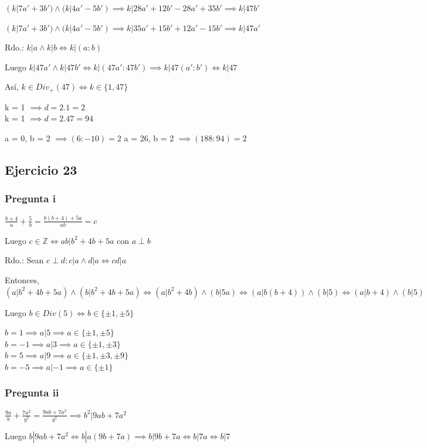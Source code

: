 $ (k|7a' + 3b') \wedge (k|4a' - 5b') \implies k|28a' + 12b' -28a' +35b' \implies k|47b' $

$ (k|7a' + 3b') \wedge (k|4a' - 5b') \implies k|35a'+15b'+12a'-15b' \implies k|47a' $

Rdo.: $ k|a \wedge k|b \iff k|(a:b)$

Luego $ k|47a' \wedge k|47b' \iff k|(47a':47b') \implies k|47(a':b') \iff k|47 $

Así, $ k \in Div_+(47) \iff k\in \{ 1,47 \} $

k = 1 $ \implies d = 2.1 = 2 $ \\
k = 1 $ \implies d = 2.47 = 94 $

a = 0, b = 2 $ \implies (6:-10) = 2$
a = 26, b = 2 $ \implies (188:94) = 2$

\subsection{Ejercicio 23}
\subsubsection{Pregunta i}

$ \frac{b+4}{a} + \frac{5}{b} = \frac{b(b+4) + 5a}{ab} = c $

Luego $ c\in \mathbb{Z} \iff ab|b^2+4b+5a $ con $ a\perp b $

Rdo.: Sean $ c \perp d: c|a \wedge d|a \iff cd|a $

Entonces, $ (a|b^2+4b+5a) \wedge (b|b^2+4b+5a) \iff (a|b^2+4b) \wedge (b|5a) \iff (a|b(b+4)) \wedge (b|5)
\iff (a|b+4) \wedge (b|5) $

Luego $ b \in Div(5) \iff b \in \{ \pm 1, \pm 5 \} $

$ b=1 \implies a|5 \implies a \in \{ \pm 1, \pm 5 \}$ \\
$ b=-1 \implies a|3 \implies a \in \{ \pm 1, \pm 3 \}$ \\
$ b=5 \implies a|9 \implies a \in \{ \pm 1, \pm 3, \pm 9 \}$ \\
$ b=-5 \implies a|-1 \implies a \in \{ \pm 1 \}$

\subsubsection{Pregunta ii}
$ \frac{9a}{b} + \frac{7a^2}{b^2} = \frac{9ab + 7a^2}{b^2} \implies b^2|9ab + 7a^2 $

Luego $ b|9ab + 7a^2 \iff b|a(9b+7a) \implies b|9b+7a \iff b|7a \iff b|7 $


